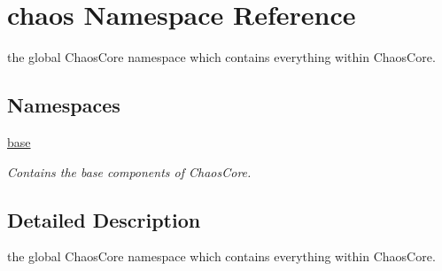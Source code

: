 \hypertarget{namespacechaos}{\section{chaos Namespace Reference}
\label{namespacechaos}
}


the global Chaos\-Core namespace which contains everything within Chaos\-Core.  


\subsection*{Namespaces}
\begin{DoxyCompactItemize}
\item 
\hyperlink{namespacechaos_1_1base}{base}
\begin{DoxyCompactList}\small\item\em Contains the base components of Chaos\-Core. \end{DoxyCompactList}\end{DoxyCompactItemize}


\subsection{Detailed Description}
the global Chaos\-Core namespace which contains everything within Chaos\-Core. 
